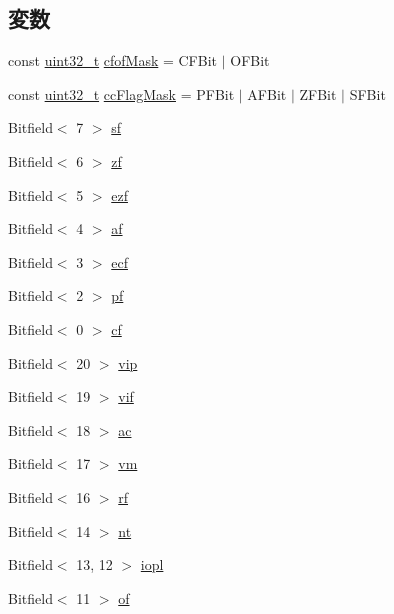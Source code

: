 \subsection*{変数}
\begin{DoxyCompactItemize}
\item 
const \hyperlink{Type_8hh_a435d1572bf3f880d55459d9805097f62}{uint32\_\-t} \hyperlink{namespaceX86ISA_a15a21dfb18ead541de5ffe79c5d26e2d}{cfofMask} = CFBit $|$ OFBit
\item 
const \hyperlink{Type_8hh_a435d1572bf3f880d55459d9805097f62}{uint32\_\-t} \hyperlink{namespaceX86ISA_ace12242afd3bc8679daac79ae1338404}{ccFlagMask} = PFBit $|$ AFBit $|$ ZFBit $|$ SFBit
\item 
Bitfield$<$ 7 $>$ \hyperlink{namespaceX86ISA_ae933b798c367bf6712555df2997ffdb6}{sf}
\item 
Bitfield$<$ 6 $>$ \hyperlink{namespaceX86ISA_a4e065baa40115a9e97f678b00ab6e331}{zf}
\item 
Bitfield$<$ 5 $>$ \hyperlink{namespaceX86ISA_af1d947c6379024c0d66832c2e1e9fd84}{ezf}
\item 
Bitfield$<$ 4 $>$ \hyperlink{namespaceX86ISA_ac1c96b02ad0857356150dc13fbcec627}{af}
\item 
Bitfield$<$ 3 $>$ \hyperlink{namespaceX86ISA_ac8f3e63e6342b7d480634837764fa194}{ecf}
\item 
Bitfield$<$ 2 $>$ \hyperlink{namespaceX86ISA_ab8f5aa23719e1969c38ca2f1c5d7b2ed}{pf}
\item 
Bitfield$<$ 0 $>$ \hyperlink{namespaceX86ISA_a7f54733f0476aea15d4f3590bbe0ce63}{cf}
\item 
Bitfield$<$ 20 $>$ \hyperlink{namespaceX86ISA_ac1f0b7dc43bc9390bc21788a3479a091}{vip}
\item 
Bitfield$<$ 19 $>$ \hyperlink{namespaceX86ISA_adb97cc053755600063859f42517065a5}{vif}
\item 
Bitfield$<$ 18 $>$ \hyperlink{namespaceX86ISA_a9b4ee74f199ac88ff6c5af0112066e15}{ac}
\item 
Bitfield$<$ 17 $>$ \hyperlink{namespaceX86ISA_aec9cf4531f16ea53778450574a6e6a68}{vm}
\item 
Bitfield$<$ 16 $>$ \hyperlink{namespaceX86ISA_ab4cc110bfe2eb87b81723e8bbf2fc328}{rf}
\item 
Bitfield$<$ 14 $>$ \hyperlink{namespaceX86ISA_afd38951fdccb8fcb42b2f42cac8c7d61}{nt}
\item 
Bitfield$<$ 13, 12 $>$ \hyperlink{namespaceX86ISA_ac966a885659ad395dbe7fd870c96544b}{iopl}
\item 
Bitfield$<$ 11 $>$ \hyperlink{namespaceX86ISA_a812166d5cea15560f9214ed7df90f800}{of}

\end{DoxyCompactItemize}
